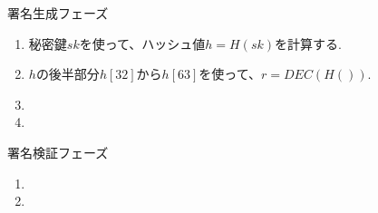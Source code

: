 \begin{itembox}[l]{署名生成フェーズ}
  \begin{enumerate}[parsep=7pt]
    \item 秘密鍵$sk$を使って、ハッシュ値$h=H(sk)$を計算する.
    \item $h$の後半部分$h[32]$から$h[63]$を使って、$r = DEC(H())$.
    \item
    \item
  \end{enumerate}
\end{itembox}

\begin{itembox}[l]{署名検証フェーズ}
  \begin{enumerate}[parsep=7pt]
    \item
    \item
  \end{enumerate}
\end{itembox}
